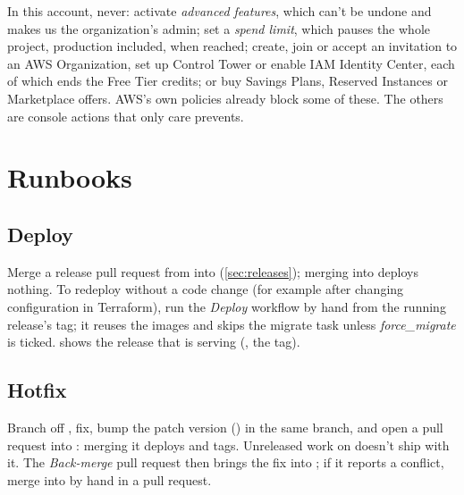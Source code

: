 \begin{risk}
  In this account, never: activate \emph{advanced features}, which can't be undone and makes us
  the organization's admin; set a \emph{spend limit}, which pauses the whole project, production
  included, when reached; create, join or accept an invitation to an AWS Organization, set up
  Control Tower or enable IAM Identity Center, each of which ends the Free Tier credits; or buy
  Savings Plans, Reserved Instances or Marketplace offers. AWS's own policies already block some
  of these. The others are console actions that only care prevents.
\end{risk}

\section{Runbooks}
\subsection{Deploy}
Merge a release pull request from  into  (\cref{sec:releases}); merging
into  deploys nothing. To redeploy without a code change (for example after changing
configuration in Terraform), run the \emph{Deploy} workflow by hand from the running release's
tag; it reuses the images and skips the migrate task unless \emph{force\_migrate} is ticked.
 shows the release that is serving (, the tag).

\subsection{Hotfix}
Branch  off , fix, bump the patch version
() in the same branch, and open a pull request into : merging it deploys
and tags. Unreleased work on  doesn't ship with it. The \emph{Back-merge} pull request
then brings the fix into ; if it reports a conflict, merge  into 
by hand in a pull request.

